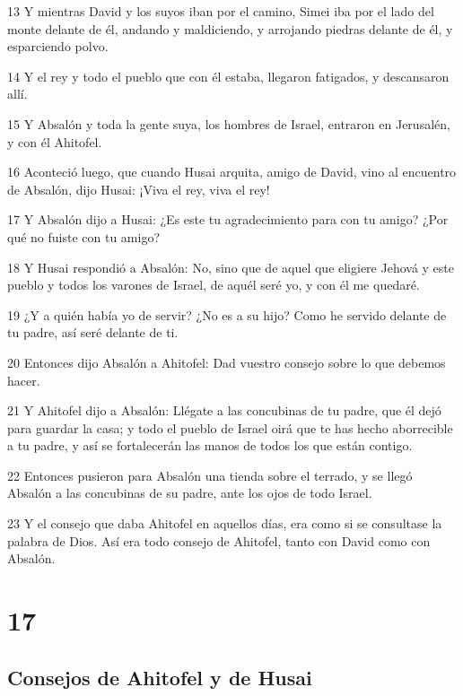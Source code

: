 \par 13 Y mientras David y los suyos iban por el camino, Simei iba por el lado del monte delante de él, andando y maldiciendo, y arrojando piedras delante de él, y esparciendo polvo.
\par 14 Y el rey y todo el pueblo que con él estaba, llegaron fatigados, y descansaron allí.
\par 15 Y Absalón y toda la gente suya, los hombres de Israel, entraron en Jerusalén, y con él Ahitofel.
\par 16 Aconteció luego, que cuando Husai arquita, amigo de David, vino al encuentro de Absalón, dijo Husai: ¡Viva el rey, viva el rey!
\par 17 Y Absalón dijo a Husai: ¿Es este tu agradecimiento para con tu amigo? ¿Por qué no fuiste con tu amigo?
\par 18 Y Husai respondió a Absalón: No, sino que de aquel que eligiere Jehová y este pueblo y todos los varones de Israel, de aquél seré yo, y con él me quedaré.
\par 19 ¿Y a quién había yo de servir? ¿No es a su hijo? Como he servido delante de tu padre, así seré delante de ti.
\par 20 Entonces dijo Absalón a Ahitofel: Dad vuestro consejo sobre lo que debemos hacer.
\par 21 Y Ahitofel dijo a Absalón: Llégate a las concubinas de tu padre, que él dejó para guardar la casa; y todo el pueblo de Israel oirá que te has hecho aborrecible a tu padre, y así se fortalecerán las manos de todos los que están contigo.
\par 22 Entonces pusieron para Absalón una tienda sobre el terrado, y se llegó Absalón a las concubinas de su padre, ante los ojos de todo Israel. 
\par 23 Y el consejo que daba Ahitofel en aquellos días, era como si se consultase la palabra de Dios. Así era todo consejo de Ahitofel, tanto con David como con Absalón.

\chapter{17}

\section*{Consejos de Ahitofel y de Husai}

